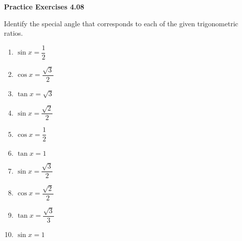 \vspace{0.3ex}
\noindent\textbf{Practice Exercises 4.08}

\vspace{0.2ex}

Identify the special angle that corresponds to each of the given trigonometric ratios.
\begin{multicols}{2}
\begin{enumerate}
    \item \( \sin x = \dfrac{1}{2} \)
    \item \( \cos x = \dfrac{\sqrt{3}}{2} \)
    \item \( \tan x = \sqrt{3} \)
    \item \( \sin x = \dfrac{\sqrt{2}}{2} \)
    \item \( \cos x = \dfrac{1}{2} \)
    \item \( \tan x = 1 \)
    \item \( \sin x = \dfrac{\sqrt{3}}{2} \)
    \item \( \cos x = \dfrac{\sqrt{2}}{2} \)
    \item \( \tan x = \dfrac{\sqrt{3}}{3} \)
    \item \( \sin x = 1 \)
\end{enumerate}
\end{multicols}

